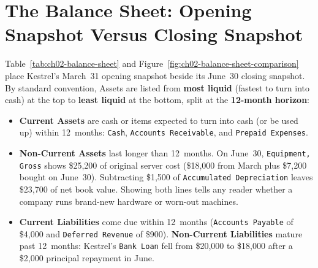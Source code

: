 \section{The Balance Sheet: Opening Snapshot Versus Closing Snapshot}

Table~\ref{tab:ch02-balance-sheet} and Figure~\ref{fig:ch02-balance-sheet-comparison} place Kestrel's March~31 opening snapshot beside its June~30 closing snapshot. By standard convention, Assets are listed from \textbf{most liquid} (fastest to turn into cash) at the top to \textbf{least liquid} at the bottom, split at the \textbf{12-month horizon}:

\begin{itemize}
  \item \textbf{Current Assets} are cash or items expected to turn into cash (or be used up) within 12~months: \texttt{Cash}, \texttt{Accounts Receivable}, and \texttt{Prepaid Expenses}.
  \item \textbf{Non-Current Assets} last longer than 12~months. On June~30, \texttt{Equipment, Gross} shows \$25,200 of original server cost (\$18,000 from March plus \$7,200 bought on June~30). Subtracting \$1,500 of \texttt{Accumulated Depreciation} leaves \$23,700 of net book value. Showing both lines tells any reader whether a company runs brand-new hardware or worn-out machines.
  \item \textbf{Current Liabilities} come due within 12~months (\texttt{Accounts Payable} of \$4,000 and \texttt{Deferred Revenue} of \$900). \textbf{Non-Current Liabilities} mature past 12~months: Kestrel's \texttt{Bank Loan} fell from \$20,000 to \$18,000 after a \$2,000 principal repayment in June.
\end{itemize}


